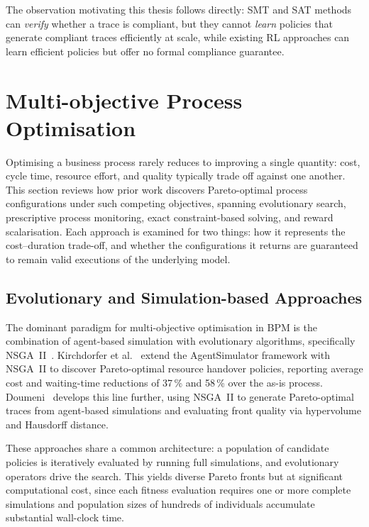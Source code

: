 The observation motivating this thesis follows directly: \ac{SMT} and
\ac{SAT} methods can \emph{verify} whether a trace is compliant, but
they cannot \emph{learn} policies that generate compliant traces
efficiently at scale, while existing \ac{RL} approaches can learn
efficient policies but offer no formal compliance guarantee.

\section{Multi-objective Process Optimisation}
\label{sec:lit_moopt}
Optimising a business process rarely reduces to improving a single
quantity: cost, cycle time, resource effort, and quality typically trade
off against one another. This section reviews how prior work discovers
Pareto-optimal process configurations under such competing objectives,
spanning evolutionary search, prescriptive process monitoring, exact
constraint-based solving, and reward scalarisation. Each approach is
examined for two things: how it represents the cost--duration trade-off,
and whether the configurations it returns are guaranteed to remain valid
executions of the underlying model.

\subsection{Evolutionary and Simulation-based Approaches}

The dominant paradigm for multi-objective optimisation in \ac{BPM} is
the combination of agent-based simulation with evolutionary algorithms,
specifically \ac{NSGA}~II~\cite{Deb2002ANSGA-II}. Kirchdorfer et
al.~\cite{KirchdorferLukasFromPolicies} extend the AgentSimulator
framework with \ac{NSGA}~II to discover Pareto-optimal resource handover
policies, reporting average cost and waiting-time reductions of 37\,\%
and 58\,\% over the as-is process.
Doumeni~\cite{ArtemisDoumeniParetoAgentSimulator} develops this line
further, using \ac{NSGA}~II to generate Pareto-optimal traces from
agent-based simulations and evaluating front quality via hypervolume and
Hausdorff distance.

These approaches share a common architecture: a population of candidate
policies is iteratively evaluated by running full simulations, and
evolutionary operators drive the search. This yields diverse Pareto
fronts but at significant computational cost, since each fitness
evaluation requires one or more complete simulations and population
sizes of hundreds of individuals accumulate substantial wall-clock time.

